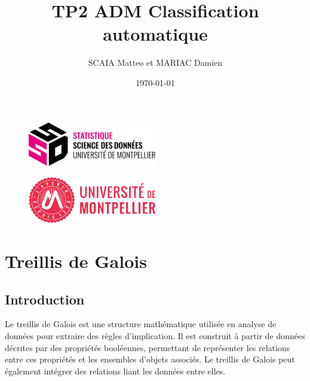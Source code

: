 \documentclass{article}
\title{TP2 ADM Classification automatique}
\author{SCAIA Matteo et MARIAC Damien}
\date{\today}
\begin{document}
\maketitle

\begin{figure}[h] 
    \centering
    \includegraphics[width=0.5\textwidth]{ssd_logo.png} 
\end{figure}

\begin{figure}[h] 
    \centering
    \includegraphics[width=0.5\textwidth]{logo_um_2022_rouge_RVB.png} 
\end{figure}

\newpage

\tableofcontents

\newpage
\section{Treillis de Galois}
\subsection{Introduction}
Le treillis de Galois est une structure mathématique utilisée en analyse de données pour extraire des règles d’implication. Il est construit à partir de données décrites par des propriétés booléennes, permettant de représenter les relations entre ces propriétés et les ensembles d’objets associés. 
Le treillis de Galois peut également intégrer des relations liant les données entre elles.
\end{document}
